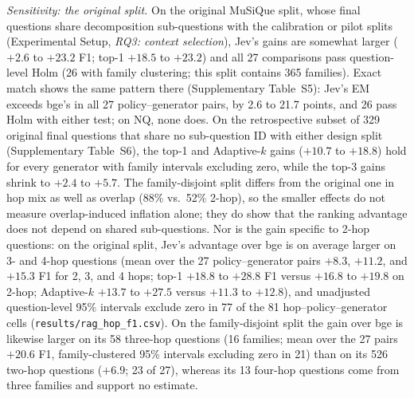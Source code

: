 \emph{Sensitivity: the original split.} On the original MuSiQue split, whose final questions share decomposition sub-questions with the calibration or pilot splits (Experimental Setup, \emph{RQ3: context selection}), Jev's gains are somewhat larger ($+2.6$ to $+23.2$ F1; top-1 $+18.5$ to $+23.2$) and all 27 comparisons pass question-level Holm (26 with family clustering; this split contains 365 families). Exact match shows the same pattern there (Supplementary Table~S5): Jev's EM exceeds bge's in all 27 policy--generator pairs, by 2.6 to 21.7 points, and 26 pass Holm with either test; on NQ, none does. On the retrospective subset of 329 original final questions that share no sub-question ID with either design split (Supplementary Table~S6), the top-1 and Adaptive-$k$ gains ($+10.7$ to $+18.8$) hold for every generator with family intervals excluding zero, while the top-3 gains shrink to $+2.4$ to $+5.7$. The family-disjoint split differs from the original one in hop mix as well as overlap (88\% vs.\ 52\% 2-hop), so the smaller effects do not measure overlap-induced inflation alone; they do show that the ranking advantage does not depend on shared sub-questions. Nor is the gain specific to 2-hop questions: on the original split, Jev's advantage over bge is on average larger on 3- and 4-hop questions (mean over the 27 policy--generator pairs $+8.3$, $+11.2$, and $+15.3$ F1 for 2, 3, and 4 hops; top-1 $+18.8$ to $+28.8$ F1 versus $+16.8$ to $+19.8$ on 2-hop; Adaptive-$k$ $+13.7$ to $+27.5$ versus $+11.3$ to $+12.8$), and unadjusted question-level 95\% intervals exclude zero in 77 of the 81 hop--policy--generator cells (\texttt{results/rag\_hop\_f1.csv}). On the family-disjoint split the gain over bge is likewise larger on its 58 three-hop questions (16 families; mean over the 27 pairs $+20.6$ F1, family-clustered 95\% intervals excluding zero in 21) than on its 526 two-hop questions ($+6.9$; 23 of 27), whereas its 13 four-hop questions come from three families and support no estimate.

